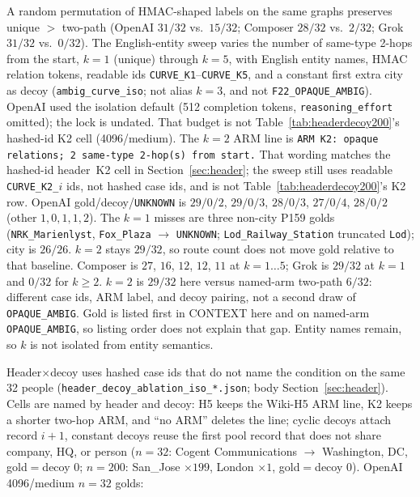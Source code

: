 \documentclass[10pt]{article} %
\begin{document}
A random permutation of HMAC-shaped labels on the same graphs preserves
unique $>$ two-path (OpenAI $31/32$ vs.\ $15/32$; Composer $28/32$ vs.\
$2/32$; Grok $31/32$ vs.\ $0/32$).
The English-entity sweep varies the number of same-type 2-hops from the
start, $k{=}1$ (unique) through $k{=}5$, with English entity names, HMAC
relation tokens, readable ids \texttt{CURVE\_K1}--\texttt{CURVE\_K5}, and a
constant first extra city as decoy (\texttt{ambig\_curve\_iso}; not alias
$k{=}3$, and not \texttt{F22\_OPAQUE\_AMBIG}).
OpenAI used the isolation default (512 completion tokens,
\texttt{reasoning\_effort} omitted); the lock is undated.
That budget is not Table~\ref{tab:headerdecoy200}'s hashed-id K2 cell
(4096/medium).
The $k{=}2$ ARM line is
\texttt{ARM K2: opaque relations; 2 same-type 2-hop(s) from start.}
That wording matches the hashed-id header~K2 cell in
Section~\ref{sec:header}; the sweep still uses readable
\texttt{CURVE\_K2\_$i$} ids, not hashed case ids, and is not Table~\ref{tab:headerdecoy200}'s K2
row.
OpenAI gold/decoy/\texttt{UNKNOWN} is $29/0/2$, $29/0/3$, $28/0/3$,
$27/0/4$, $28/0/2$ (other $1,0,1,1,2$).
The $k{=}1$ misses are three non-city P159 golds
(\texttt{NRK\_Marienlyst}, \texttt{Fox\_Plaza} $\to$ \texttt{UNKNOWN};
\texttt{Lod\_Railway\_Station} truncated \texttt{Lod}); city is $26/26$.
$k{=}2$ stays $29/32$, so route count does not move gold relative to that
baseline.
Composer is $27$, $16$, $12$, $12$, $11$ at $k{=}1{\ldots}5$; Grok is
$29/32$ at $k{=}1$ and $0/32$ for $k{\ge}2$.
$k{=}2$ is $29/32$ here versus named-arm two-path $6/32$: different case
ids, ARM label, and decoy pairing, not a second draw of
\texttt{OPAQUE\_AMBIG}.
Gold is listed first in CONTEXT here and on named-arm
\texttt{OPAQUE\_AMBIG}, so listing order does not explain that gap.
Entity names remain, so $k$ is not isolated from entity semantics.

Header$\times$decoy uses hashed case ids that do not name the condition
on the same 32 people
(\texttt{header\_decoy\_ablation\_iso\_*.json}; body
Section~\ref{sec:header}).
Cells are named by header and decoy:
H5 keeps the Wiki-H5 ARM line, K2 keeps a shorter two-hop ARM, and
``no ARM'' deletes the line; cyclic decoys attach record $i{+}1$, constant
decoys reuse the first pool record that does not share company, HQ, or
person ($n{=}32$: Cogent Communications $\to$ Washington, DC, gold$=$decoy $0$;
$n{=}200$: San\_Jose ${\times}199$, London ${\times}1$, gold$=$decoy $0$).
OpenAI 4096/medium $n{=}32$ golds:
\end{document}
